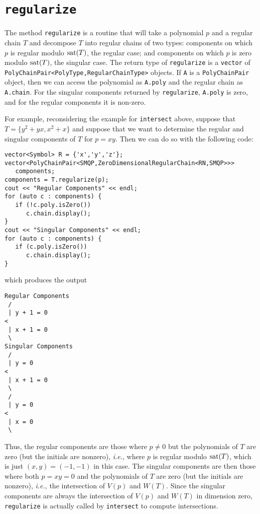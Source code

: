 \section{\texttt{regularize}}
The method \texttt{regularize} is a routine that will take a polynomial $p$ and a regular chain $T$ and decompose $T$ into regular chains of two types: components on which $p$ is regular modulo $\mbox{{\rm sat}$(T)$}$, the regular case; and components on which $p$ is zero modulo $\mbox{{\rm sat}$(T)$}$, the singular case. The return type of \texttt{regularize} is a \texttt{vector} of \texttt{PolyChainPair<PolyType,RegularChainType>} objects. If \texttt{A} is a  \texttt{PolyChainPair} object, then we can access the polynomial as \texttt{A.poly} and the regular chain as \texttt{A.chain}. For the singular components returned by \texttt{regularize}, \texttt{A.poly} is zero, and for the regular components it is non-zero.

For example, reconsidering the example for \texttt{intersect} above, suppose that $T=\{y^2+yx,x^2+x\}$ and suppose that we want to determine the regular and singular components of $T$ for $p=xy$. Then we can do so with the following code:
\begin{verbatim}
vector<Symbol> R = {'x','y','z'};
vector<PolyChainPair<SMQP,ZeroDimensionalRegularChain<RN,SMQP>>>
   components;
components = T.regularize(p);
cout << "Regular Components" << endl;
for (auto c : components) {
   if (!c.poly.isZero())
      c.chain.display();
}
cout << "Singular Components" << endl;
for (auto c : components) {
   if (c.poly.isZero())
      c.chain.display();
}
\end{verbatim}
which produces the output
\begin{verbatim}
Regular Components
 /
 | y + 1 = 0
< 
 | x + 1 = 0
 \ 
Singular Components
 /
 | y = 0
< 
 | x + 1 = 0
 \ 
 /
 | y = 0
< 
 | x = 0
 \ 
\end{verbatim}
Thus, the regular components are those where $p\neq 0$ but the polynomials of $T$ are zero (but the initials are nonzero), \emph{i.e.}, where $p$ is regular modulo $\mbox{{\rm sat}$(T)$}$, which is just $(x,y)=(-1,-1)$ in this case. The singular components are then those where both $p=xy=0$ and the polynomials of $T$ are zero (but the initials are nonzero), \emph{i.e.}, the intersection of $V(p)$ and $W(T)$. Since the singular components are always the intersection of $V(p)$ and $W(T)$ in dimension zero, \texttt{regularize} is actually called by \texttt{intersect} to compute intersections.
